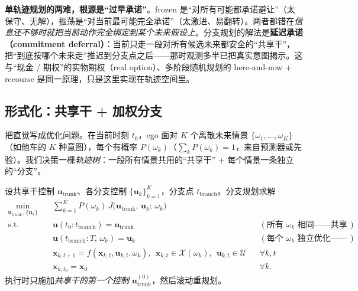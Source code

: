 \begin{insight}
\textbf{单轨迹规划的两难，根源是“过早承诺”}。frozen 是“对所有可能都承诺避让”（太保守、无解），振荡是“对当前最可能完全承诺”（太激进、易翻转）。两者都错在\emph{信息还不够时就把当前动作完全绑定到某个未来假设上}。分支规划的解法是\textbf{延迟承诺（commitment deferral）}：当前只走一段对所有候选未来都安全的“共享干”，把“到底按哪个未来走”推迟到分支点之后——那时观测多半已把真实意图揭示。这与“现金 / 期权”的实物期权（real option）、多阶段随机规划的 here-and-now + recourse 是同一原理，只是这里实现在轨迹空间里。
\end{insight}

\subsection{形式化：共享干 + 加权分支}
\label{sec:pr-branch-formal}

把直觉写成优化问题。在当前时刻 $t_0$，ego 面对 $K$ 个离散未来情景 $\{\omega_1,\dots,\omega_K\}$（如他车的 $K$ 种意图），每个有概率 $P(\omega_k)$（$\sum_k P(\omega_k)=1$，来自预测器或先验）。我们决策一棵\emph{轨迹树}：一段所有情景共用的“共享干” + 每个情景一条独立的“分支”\cite{hardy2013contingency}。

\begin{definition}[分支 / contingency 规划]\label{def:pr-contingency}
设共享干控制 $\mathbf{u}_{\mathrm{trunk}}$、各分支控制 $\{\mathbf{u}_k\}_{k=1}^K$，分支点 $t_{\mathrm{branch}}$。分支规划求解
\begin{equation}
\begin{aligned}
\min_{\mathbf{u}_{\mathrm{trunk}},\,\{\mathbf{u}_k\}}\quad & \sum_{k=1}^{K} P(\omega_k)\, J\big(\mathbf{u}_{\mathrm{trunk}},\,\mathbf{u}_k;\,\omega_k\big)\\
\text{s.t.}\quad
& \mathbf{u}(t_0:t_{\mathrm{branch}}) = \mathbf{u}_{\mathrm{trunk}} && (\text{所有 }\omega_k\text{ 相同——共享干 / 非预期约束})\\
& \mathbf{u}(t_{\mathrm{branch}}:T,\,\omega_k) = \mathbf{u}_k && (\text{每个 }\omega_k\text{ 独立优化——分支})\\
& \mathbf{x}_{k,t+1}=f(\mathbf{x}_{k,t},\mathbf{u}_{k,t},\omega_k),\ \ \mathbf{x}_{k,t}\in\mathcal{X}(\omega_k),\ \ \mathbf{u}_{k,t}\in\mathcal{U} && \forall k,t\\
& \mathbf{x}_{k,t_0}=\mathbf{x}_0 && \forall k.
\end{aligned}
\label{eq:pr-contingency}
\end{equation}
执行时只施加\emph{共享干的第一个控制} $\mathbf{u}_{\mathrm{trunk}}^{(0)}$，然后滚动重规划。
\end{definition}

